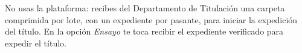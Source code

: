 \documentclass[11pt,a4paper]{article}
\begin{document}
{\small\tableofcontents}
\newpage
\begin{quevasahacer}
No usas la plataforma: recibes del Departamento de Titulación una carpeta comprimida por lote, con un expediente por pasante, para iniciar la expedición del título. En la opción \emph{Ensayo} te toca recibir el expediente verificado para expedir el título.
\end{quevasahacer}



\end{document}
